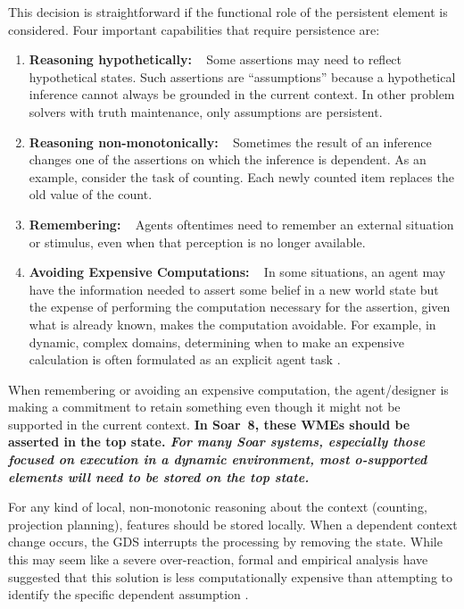This decision is straightforward if the functional role of the
persistent element is considered.  Four important capabilities that
require persistence are:
\begin{enumerate}

\item \textbf{Reasoning hypothetically:} ~ Some assertions may need to
reflect hypothetical states.  Such assertions are ``assumptions''
because a hypothetical inference cannot always be grounded in the
current context.  In other problem solvers with truth maintenance,
only assumptions are persistent.

\item \textbf{Reasoning non-monotonically:} ~
Sometimes the result of an inference changes one of the assertions on
which the inference is dependent.  As an example, consider the task of
counting.  Each newly counted item replaces the old value of the
count. 

\item \textbf{Remembering:} ~
Agents oftentimes need to remember an external situation or stimulus,
even when that perception is no longer available.  

\item \textbf{Avoiding Expensive Computations:} ~ In some situations,
an agent may have the information needed to assert some belief in a
new world state but the expense of performing the computation
necessary for the assertion, given what is already known, makes the
computation avoidable.  For example, in dynamic, complex domains,
determining when to make an expensive calculation is often formulated
as an explicit agent task \cite{Jones99:Automated}.
\end{enumerate}

When remembering or avoiding an expensive computation, the
agent/designer is making a commitment to retain something even though
it might not be supported in the current context.  \textbf{In Soar~8, these
WMEs should be asserted in the top state.  \emph{For many Soar systems,
especially those focused on execution in a dynamic environment, 
most o-supported elements will need to be stored on the top state.}} 

For any kind of local, non-monotonic reasoning about the context
(counting, projection planning), features should be stored locally.
When a dependent context change occurs, the GDS interrupts the
processing by removing the state.  While this may seem like a severe
over-reaction, formal and empirical analysis have suggested that this
solution is less computationally expensive than attempting to identify
the specific dependent assumption \cite{Wray03:Ensuring}.

